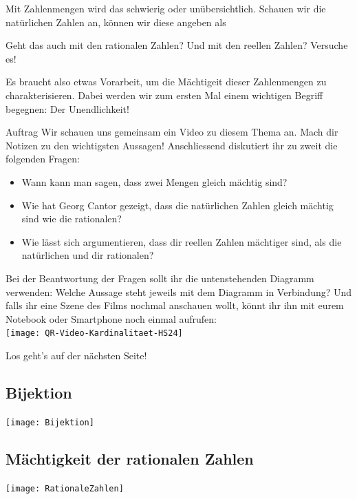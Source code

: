 Mit Zahlenmengen wird das schwierig oder unübersichtlich. Schauen wir die natürlichen Zahlen an, können wir diese angeben als

\vspace{1.5cm}

Geht das auch mit den rationalen Zahlen? Und mit den reellen Zahlen? Versuche es!

\vspace{1.5cm}

Es braucht also etwas Vorarbeit, um die Mächtigeit dieser Zahlenmengen zu charakterisieren. Dabei werden wir zum ersten Mal einem wichtigen Begriff begegnen: Der Unendlichkeit! 

\begin{task}{Auftrag}
Wir schauen uns gemeinsam ein Video zu diesem Thema an. Mach dir Notizen zu den wichtigsten Aussagen! Anschliessend diskutiert ihr zu zweit die folgenden Fragen:
	\begin{itemize}
		\item
			Wann kann man sagen, dass zwei Mengen gleich mächtig sind?
		\item
			Wie hat Georg Cantor gezeigt, dass die natürlichen Zahlen gleich mächtig sind wie die rationalen?
		\item
			Wie lässt sich argumentieren, dass dir reellen Zahlen mächtiger sind, als die natürlichen und dir rationalen?
	\end{itemize}
	Bei der Beantwortung der Fragen sollt ihr die untenstehenden Diagramm verwenden: Welche Aussage steht jeweils mit dem Diagramm in Verbindung? Und falls ihr eine Szene des Films nochmal anschauen wollt, könnt ihr ihn mit eurem Notebook oder Smartphone noch einmal aufrufen:\\
	\texttt{[image: QR-Video-Kardinalitaet-HS24]}
\end{task}

Los geht's auf der nächsten Seite!

\newpage


\subsection{Bijektion}
\texttt{[image: Bijektion]}

\subsection{Mächtigkeit der rationalen Zahlen}
\texttt{[image: RationaleZahlen]}

